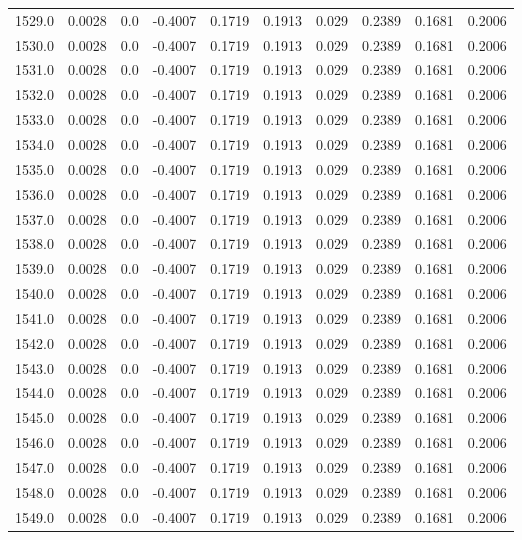 \begin{longtable}{lrrrrrrrrr}
1529.0 & 0.0028 & 0.0 & -0.4007 & 0.1719 & 0.1913 & 0.029 & 0.2389 & 0.1681 & 0.2006 \\
1530.0 & 0.0028 & 0.0 & -0.4007 & 0.1719 & 0.1913 & 0.029 & 0.2389 & 0.1681 & 0.2006 \\
1531.0 & 0.0028 & 0.0 & -0.4007 & 0.1719 & 0.1913 & 0.029 & 0.2389 & 0.1681 & 0.2006 \\
1532.0 & 0.0028 & 0.0 & -0.4007 & 0.1719 & 0.1913 & 0.029 & 0.2389 & 0.1681 & 0.2006 \\
1533.0 & 0.0028 & 0.0 & -0.4007 & 0.1719 & 0.1913 & 0.029 & 0.2389 & 0.1681 & 0.2006 \\
1534.0 & 0.0028 & 0.0 & -0.4007 & 0.1719 & 0.1913 & 0.029 & 0.2389 & 0.1681 & 0.2006 \\
1535.0 & 0.0028 & 0.0 & -0.4007 & 0.1719 & 0.1913 & 0.029 & 0.2389 & 0.1681 & 0.2006 \\
1536.0 & 0.0028 & 0.0 & -0.4007 & 0.1719 & 0.1913 & 0.029 & 0.2389 & 0.1681 & 0.2006 \\
1537.0 & 0.0028 & 0.0 & -0.4007 & 0.1719 & 0.1913 & 0.029 & 0.2389 & 0.1681 & 0.2006 \\
1538.0 & 0.0028 & 0.0 & -0.4007 & 0.1719 & 0.1913 & 0.029 & 0.2389 & 0.1681 & 0.2006 \\
1539.0 & 0.0028 & 0.0 & -0.4007 & 0.1719 & 0.1913 & 0.029 & 0.2389 & 0.1681 & 0.2006 \\
1540.0 & 0.0028 & 0.0 & -0.4007 & 0.1719 & 0.1913 & 0.029 & 0.2389 & 0.1681 & 0.2006 \\
1541.0 & 0.0028 & 0.0 & -0.4007 & 0.1719 & 0.1913 & 0.029 & 0.2389 & 0.1681 & 0.2006 \\
1542.0 & 0.0028 & 0.0 & -0.4007 & 0.1719 & 0.1913 & 0.029 & 0.2389 & 0.1681 & 0.2006 \\
1543.0 & 0.0028 & 0.0 & -0.4007 & 0.1719 & 0.1913 & 0.029 & 0.2389 & 0.1681 & 0.2006 \\
1544.0 & 0.0028 & 0.0 & -0.4007 & 0.1719 & 0.1913 & 0.029 & 0.2389 & 0.1681 & 0.2006 \\
1545.0 & 0.0028 & 0.0 & -0.4007 & 0.1719 & 0.1913 & 0.029 & 0.2389 & 0.1681 & 0.2006 \\
1546.0 & 0.0028 & 0.0 & -0.4007 & 0.1719 & 0.1913 & 0.029 & 0.2389 & 0.1681 & 0.2006 \\
1547.0 & 0.0028 & 0.0 & -0.4007 & 0.1719 & 0.1913 & 0.029 & 0.2389 & 0.1681 & 0.2006 \\
1548.0 & 0.0028 & 0.0 & -0.4007 & 0.1719 & 0.1913 & 0.029 & 0.2389 & 0.1681 & 0.2006 \\
1549.0 & 0.0028 & 0.0 & -0.4007 & 0.1719 & 0.1913 & 0.029 & 0.2389 & 0.1681 & 0.2006 \\

\end{longtable}
